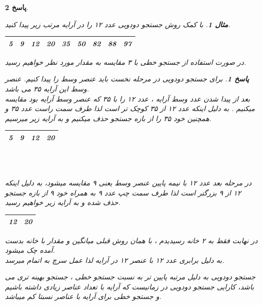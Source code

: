 \documentclass[12pt]{article}
\newtheorem{question}{مثال}[section]
\newtheorem{answer}{پاسخ}[section]
\begin{document}
\begin{answer}
\begin{question}
با کمک روش جستجو دودویی عدد ۱۲ را در آرایه مرتب زیر پیدا کنید.\\
\begin{LTR}
\begin{tabular}{|c|c|c|c|c|c|c|c|c|}
\hline
5 & 9 & 12 & 20 & 35 & 50 & 82 & 88 & 97 \\
\hline
\end{tabular}
\end{LTR}

\end{question}
در صورت استفاده از جستجو خطی با ۳ مقایسه به مقدار مورد نظر خواهیم رسید.\\ 
\begin{answer}
برای جستجو دودویی در مرحله نخست باید عنصر وسط را پیدا کنیم.
عنصر وسط این آرایه ۳۵ می باشد.\\
بعد از پیدا شدن عدد وسط آرایه ، عدد ۱۲ را با ۳۵ که عنصر وسط آرایه بود مقایسه میکنیم . به دلیل اینکه عدد ۱۲ از ۳۵ کوچک تر است لذا طرف سمت راست عدد ۳۵ و همچنین خود ۳۵ را از بازه جستجو حذف میکنیم و به آرایه زیر میرسیم.\\
\begin{LTR}
\begin{tabular}{|c|c|c|c|}
\hline
5 & 9 & 12 & 20\\
\hline
\end{tabular}\\
\end{LTR}\\

در مرحله بعد عدد ۱۲ با نیمه پایین عنصر وسط یعنی ۹ مقایسه میشود، به دلیل اینکه ۱۲ از ۹ بزرگتر است لذا طرف سمت چپ عدد ۹ به همراه خود ۹ از بازه جستجو حذف شده و به آرایه زیر خواهیم رسید.\\

\begin{LTR}
\begin{tabular}{|c|c|}
\hline
12 & 20\\
\hline
\end{tabular}
\end{LTR}

در نهابت فقط به ۲ خانه رسیدیدم ، با همان روش قبلی میانگین و مقدار با خانه بدست آمده چک میشود.\\
به دلیل برابری عدد ۱۲ با عنصر ۱۲ در آرایه لذا عمل سرچ به اتمام میرسد.\\
\end{answer}
\newline


جستجو دودویی  به دلیل مرتبه پایین تر به نسبت جستجو خطی ، جستجو بهینه تری می باشد، کارایی جستجو دودویی در زمانیست که آرایه با تعداد عناصر زیادی داشته باشیم و جستجو خطی برای آرایه با عناصر نسبتا کم میباشد.\\
 


\end{answer}
\end{document}
